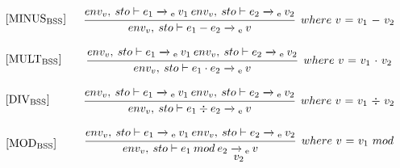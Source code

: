 \begin{equation}
\begin{minipage}{.2\linewidth}
$[\text{MINUS}_\text{BSS}]$
\end{minipage}
\begin{minipage}{.8\linewidth}
\centering
$\cfrac{env_v, \: sto \vdash e_1 \xrightarrow{}\textsubscript{e} \: v_1 \: env_v, \: sto \vdash e_2 \xrightarrow{}\textsubscript{e} \: v_2}{env_v, \: sto \vdash e_1 - e_2 \xrightarrow{}\textsubscript{e} \: v}$
$ \: where$ $v$ $=$ $v_1$ $-$ $v_2$
\end{minipage}
\end{equation}

\begin{equation}
\begin{minipage}{.2\linewidth}
$[\text{MULT}_\text{BSS}]$
\end{minipage}
\begin{minipage}{.8\linewidth}
\centering
$\cfrac{env_v, \: sto \vdash e_1 \xrightarrow{}\textsubscript{e} \: v_1 \: env_v, \: sto \vdash e_2 \xrightarrow{}\textsubscript{e} \: v_2}{env_v, \: sto \vdash e_1 \cdot e_2 \xrightarrow{}\textsubscript{e} \: v}$
$ \: where$ $v$ $=$ $v_1$ $\cdot$ $v_2$
\end{minipage}
\end{equation}

\begin{equation}
\begin{minipage}{.2\linewidth}
$[\text{DIV}_\text{BSS}]$
\end{minipage}
\begin{minipage}{.8\linewidth}
\centering
$\cfrac{env_v, \: sto \vdash e_1 \xrightarrow{}\textsubscript{e} \: v_1 \: env_v, \: sto \vdash e_2 \xrightarrow{}\textsubscript{e} \: v_2}{env_v, \: sto \vdash e_1 \div e_2 \xrightarrow{}\textsubscript{e} \: v}$
$ \: where$ $v$ $=$ $v_1$ $\div$ $v_2$
\end{minipage}
\end{equation}

\begin{equation}
\begin{minipage}{.2\linewidth}
$[\text{MOD}_\text{BSS}]$
\end{minipage}
\begin{minipage}{.8\linewidth}
\centering
$\cfrac{env_v, \: sto \vdash e_1 \xrightarrow{}\textsubscript{e} \: v_1 \: env_v, \: sto \vdash e_2 \xrightarrow{}\textsubscript{e} \: v_2}{env_v, \: sto \vdash e_1 \: mod \: e_2 \xrightarrow{}\textsubscript{e} \: v}$
$ \: where$ $v$ $=$ $v_1$ $mod$ $v_2$
\end{minipage}
\end{equation}

